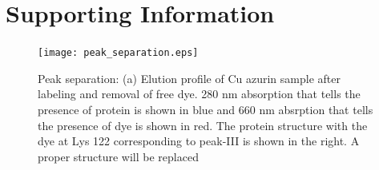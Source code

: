
\graphicspath{{chapters/c4_azurin_sm/si/}}
%  

\section*{Supporting Information}
\begin{figure}
  \centering
  \texttt{[image: peak\_separation.eps]}
  \makeatletter
  \renewcommand{\fnum@figure}{\figurename~S\thefigure}
  \makeatother
  \caption{Peak separation: (a) Elution profile of Cu azurin sample after labeling and removal of free dye. 280 nm absorption that tells the presence of protein is shown in blue and 660 nm absrption that tells the presence of dye is shown in red. The protein structure with the dye at Lys 122 corresponding to peak-III is shown in the right. {A proper structure will be replaced}}
  \label{SIfig: peak_sep}
\end{figure}
